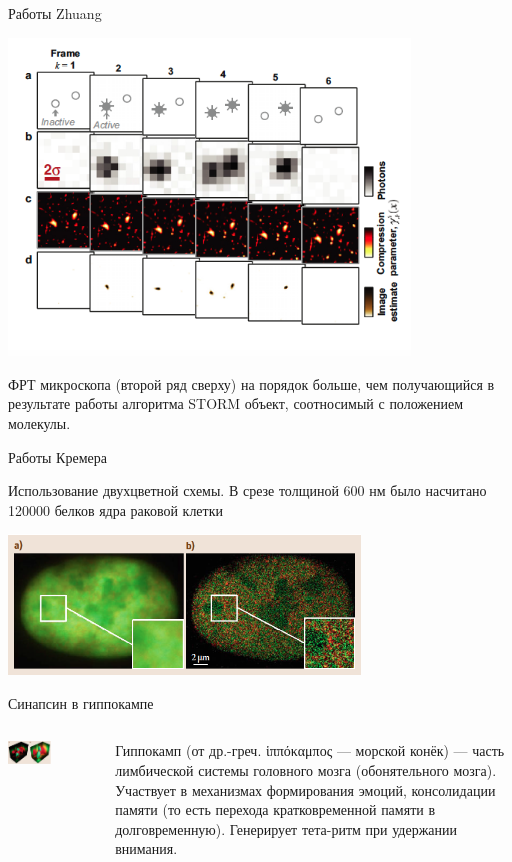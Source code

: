 \documentclass[9pt, compress, xcolor=table]{beamer}
\begin{document}
\begin{frame}{Работы Zhuang}
\begin{center}
\includegraphics[width=0.8\textwidth]{lm8}

ФРТ микроскопа (второй ряд сверху) на порядок больше, чем получающийся в результате работы алгоритма STORM объект, соотносимый с положением молекулы.

\end{center}
\end{frame}

\begin{frame}{Работы Кремера}

Использование двухцветной схемы. В срезе толщиной 600 нм было насчитано 120000 белков ядра раковой клетки
\begin{center}
\includegraphics[width=0.7\textwidth]{ffm12}
\end{center}
Синапсин в гиппокампе
\begin{columns}[c]
\column{6.5cm}
\begin{center}
\includegraphics[width=0.5\textwidth]{ffm14}
\end{center}
\column{6.5cm}
{\tiny Гиппокамп (от др.-греч. ἱππόκαμπος — морской конёк) — часть лимбической системы головного мозга (обонятельного мозга). Участвует в механизмах формирования эмоций, консолидации памяти (то есть перехода кратковременной памяти в долговременную). Генерирует тета-ритм при удержании внимания.}
\end{columns}
\end{frame}
\end{document}
